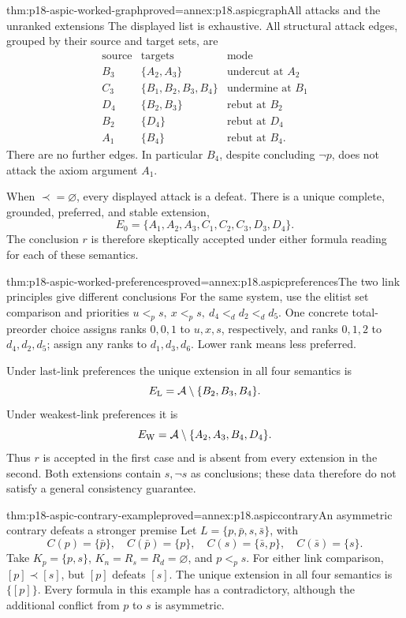 \begin{hbtheorem}{thm:p18-aspic-worked-graph}{proved=annex:p18.aspicgraph}{All attacks and the unranked extensions}
The displayed list is exhaustive. All structural attack edges, grouped
by their source and target sets, are
\[
\begin{array}{c|c|l}
\text{source}&\text{targets}&\text{mode}\\ \hline
B_3&\{A_2,A_3\}&\text{undercut at }A_2\\
C_3&\{B_1,B_2,B_3,B_4\}&\text{undermine at }B_1\\
D_4&\{B_2,B_3\}&\text{rebut at }B_2\\
B_2&\{D_4\}&\text{rebut at }D_4\\
A_1&\{B_4\}&\text{rebut at }B_4 .
\end{array}
\]
There are no further edges. In particular \(B_4\), despite concluding
\(\neg p\), does not attack the axiom argument \(A_1\).

When \(\prec=\varnothing\), every displayed attack is a defeat.
There is a unique complete, grounded, preferred, and stable extension,
\[
 E_0=\{A_1,A_2,A_3,C_1,C_2,C_3,D_3,D_4\}.
\]
The conclusion \(r\) is therefore skeptically accepted under either formula
reading for each of these semantics.
\end{hbtheorem}

\begin{hbtheorem}{thm:p18-aspic-worked-preferences}{proved=annex:p18.aspicpreferences}{The two link principles give different conclusions}
For the same system, use the elitist set comparison and priorities
\(u<_p s,\ x<_p s,\ d_4<_d d_2<_d d_5\).
One concrete total-preorder choice assigns ranks \(0,0,1\) to \(u,x,s\),
respectively, and ranks \(0,1,2\) to \(d_4,d_2,d_5\);
assign any ranks to \(d_1,d_3,d_6\). Lower rank means less preferred.

Under last-link preferences the unique extension in all four semantics is
\[
 E_{\rm L}=\mathcal A\setminus\{B_2,B_3,B_4\}.
\]
Under weakest-link preferences it is
\[
 E_{\rm W}=\mathcal A\setminus\{A_2,A_3,B_4,D_4\}.
\]
Thus \(r\) is accepted in the first case and is absent from every extension
in the second. Both extensions contain \(s,\neg s\)
as conclusions; these data therefore do not satisfy a general consistency
guarantee.
\end{hbtheorem}

\begin{hbtheorem}{thm:p18-aspic-contrary-example}{proved=annex:p18.aspiccontrary}{An asymmetric contrary defeats a stronger premise}
Let \(L=\{p,\bar p,s,\bar s\}\), with
\[
 C(p)=\{\bar p\},\quad C(\bar p)=\{p\},\quad
 C(s)=\{\bar s,p\},\quad C(\bar s)=\{s\}.
\]
Take \(K_p=\{p,s\}\), \(K_n=R_s=R_d=\varnothing\), and \(p<_p s\).
For either link comparison, \([p]\prec[s]\), but \([p]\) defeats \([s]\).
The unique extension in all four semantics is \(\{[p]\}\).
Every formula in this example has a contradictory, although the additional
conflict from \(p\) to \(s\) is asymmetric.
\end{hbtheorem}


